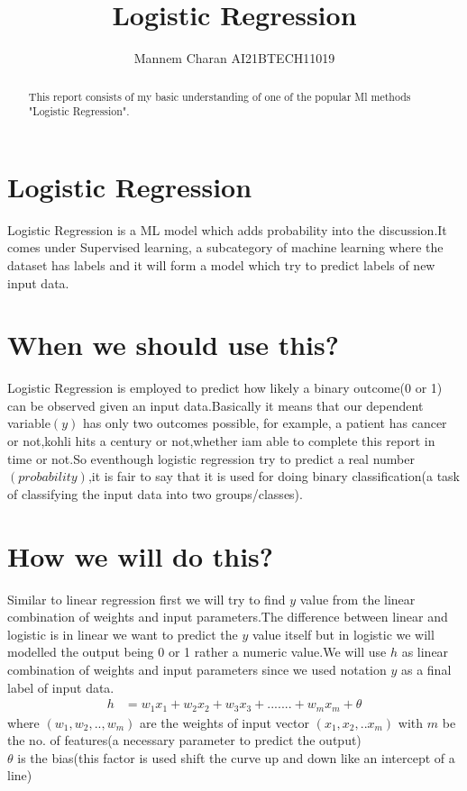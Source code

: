 \documentclass[journal,12pt,onecolumn]{IEEEtran}
\providecommand{\brak}[1]{\ensuremath{\left(#1\right)}}
\theoremstyle{remark}
\numberwithin{equation}{section}
\begin{document}
		\title{ Logistic Regression }
		\maketitle
		\author{ Mannem Charan AI21BTECH11019}
		\begin{abstract}
			This report consists of my basic understanding of one of the popular Ml methods "Logistic Regression".
		\end{abstract}
		\section{Logistic Regression}
		Logistic Regression is a ML model which adds probability into the discussion.It comes under Supervised learning, a subcategory of machine learning where the dataset has labels and it will form a model which try to predict labels of new input data.\\
		\section{When we should use this?}
		Logistic Regression is employed to predict how likely a binary outcome(0 or 1) can be observed given an input data.Basically it means that our dependent variable$\brak{y}$ has only two outcomes possible, for example, a patient has cancer or not,kohli hits a century or not,whether iam able to complete this report in time or not.So eventhough logistic regression try to predict a real number$\brak{probability}$,it is fair to say that it is used for doing binary classification(a task of classifying the input data into two groups/classes).
		\section{How we will do this?}
		Similar to linear regression first we will try to find $y$ value from the linear combination of weights and input parameters.The difference between linear and logistic is in linear we want to predict the $y$ value itself but in logistic we will modelled the output being 0 or 1 rather a numeric value.We will use $h$ as linear combination of weights and input parameters since we used notation $y$ as a final label of input data. 
		\begin{align}
			h &= w_{1}x_{1} + w_{2}x_{2} + w_3x_3 +.......+w_mx_m + \theta 
		\end{align}
		where $\brak{w_1,w_2,..,w_m}$ are the weights of input vector $\brak{x_1,x_2,..x_m}$ with $m$ be the no. of features(a necessary parameter to predict the output)\\
		$\theta$ is the bias(this factor is used shift the curve up and down like an intercept of a line) 
\end{document}
